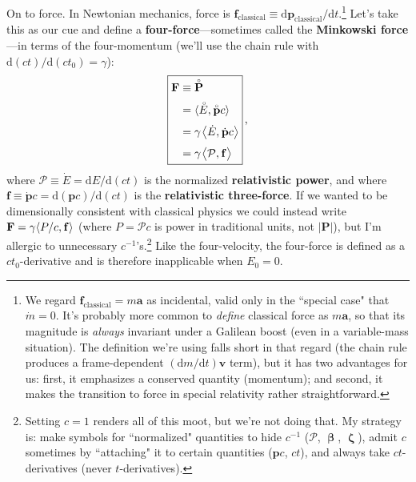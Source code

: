 \documentclass[12pt]{article}
\renewcommand{\mathring}[1]{\accentset{\circ}{#1}}
\renewcommand{\vv}[1]{\mathbf{#1}}
\newcommand{\dd}[1]{\mathrm{d}#1}
\newcommand{\vvbeta}{\bm{\upbeta}}
\newcommand{\vvzeta}{\bm{\upzeta}}
\begin{document}
On to force. In Newtonian mechanics, force is $\vv f_{\mathrm{classical}} \equiv \dd \vv p_{\mathrm{classical}} / \dd t$.\footnote{\label{fn:cf}We regard $\vv f_{\mathrm{classical}} = m \vv a$ as incidental, valid only in the ``special case" that $\dot{m} = 0$. It's probably more common to \emph{define} classical force as $m \vv a$, so that its magnitude is \emph{always} invariant under a Galilean boost (even in a variable-mass situation). The definition we're using falls short in that regard (the chain rule produces a frame-dependent $(\dd m / \dd t) \vv v$ term), but it has two advantages for us: first, it emphasizes a conserved quantity (momentum); and second, it makes the transition to force in special relativity rather straightforward.} Let's take this as our cue and define a \textbf{four-force}---sometimes called the \textbf{Minkowski force}---in terms of the four-momentum (we'll use the chain rule with $\dd (ct) / \dd (c t_0) = \gamma$):
\begin{equation}\label{eq:33}
\boxed{
\begin{aligned}
\vv F &\equiv \mathring{\vv P} \\[2pt]
&= \langle \mathring{E}, \mkern.5mu \mathring{\vv p} c \rangle \\[3pt]
&= \gamma \mkern1.5mu \big \langle \dot{E}, \mkern.5mu \dot{\vv p} c \big \rangle \\[3pt]
&=\gamma \mkern1.5mu \big \langle \mathcal{P}, \mkern.5mu \vv f \big \rangle
\end{aligned}
} \, ,
\end{equation}
where $\mathcal{P} \equiv \dot{E} = \dd E / \dd (ct)$ is the normalized \textbf{relativistic power}, and where ${\vv f \equiv \dot{\vv p} c = \dd (\vv p c) / \dd (ct)}$ is the \textbf{relativistic three-force}. If we wanted to be dimensionally consistent with classical physics we could instead write ${\vv F = \gamma \langle P/c, \mkern.5mu \vv f \rangle}$ (where $P = \mathcal{P}c$ is power in traditional units, not $\vert \vv P \vert$), but I'm allergic to unnecessary $c^{-1}$'s.\footnote{Setting $c = 1$ renders all of this moot, but we're not doing that. My strategy is: make symbols for ``normalized" quantities to hide $c^{-1}$ ($\mathcal P$, $\vvbeta$, $\vvzeta$), admit $c$ sometimes by ``attaching" it to certain quantities ($\vv p c$, $ct$), and always take $ct$-derivatives (never $t$-derivatives).} Like the four-velocity, the four-force is defined as a $ct_0$-derivative and is therefore inapplicable when $E_0 = 0$.
\end{document}
